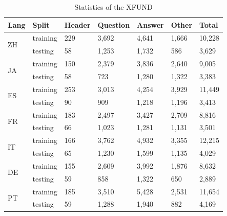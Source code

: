 \begin{table}[H]
\centering
\begin{tabular}{@{}lllllll@{}}
\hline
                 \textbf{Lang} & \textbf{Split}  &\textbf{Header}  &\textbf{Question}  & \textbf{Answer}  &\textbf{Other}  &\textbf{Total}  \\ \toprule
\multirow{2}{*}{ZH} &  training&229  &  3,692& 4,641  & 1,666  &10,228  \\ 
                  &  testing& 58  &1,253  & 1,732  & 586  & 3,629  \\ \midrule
\multirow{2}{*}{JA} & training & 150  & 2,379  & 3,836  & 2,640  & 9,005  \\
                  &  testing & 58  & 723  & 1,280  & 1,322  & 3,383  \\\midrule
\multirow{2}{*}{ES} & training  &  253& 3,013  & 4,254  &3,929  &11,449  \\
                  &  testing&  90& 909 &1,218  &1,196  &3,413  \\\midrule
\multirow{2}{*}{FR} & training & 183  &2,497  &3,427  &2,709  &8,816  \\
                  &  testing&66  &1,023  &1,281  &1,131  &3,501  \\\midrule
\multirow{2}{*}{IT} &  training &166  &3,762  &4,932  &3,355  &12,215  \\
                  &  testing& 65 &1,230  &1,599  &1,135 &4,029  \\\midrule
\multirow{2}{*}{DE} &training  &155  &2,609  &3,992  &1,876  &8,632  \\
                  &  testing&59  &858  &1,322  &650  &2,889  \\\midrule
\multirow{2}{*}{PT} & training &185  & 3,510 &5,428  &2,531   &  11,654\\
                  &  testing &59  &1,288  &1,940  &882  &4,169 \\ \bottomrule
\end{tabular}
\caption{Statistics of the XFUND \cite{xfund}}
\label{tab:XFUND_statistics}
\end{table}

